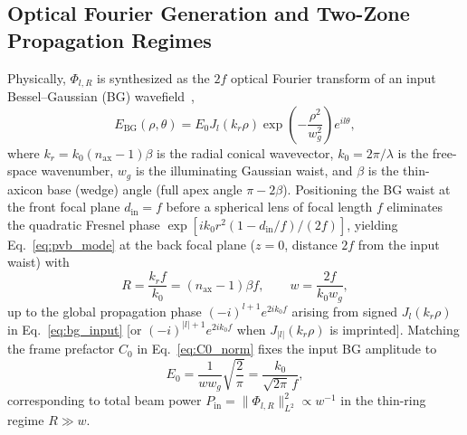 \documentclass[aps,pra,reprint,nofootinbib,floatfix,longbibliography]{revtex4-2}
\theoremstyle{remark}
\newcommand{\norm}[1]{\lVert #1 \rVert}
\newcommand{\abs}[1]{\lvert #1 \rvert}
\begin{document}
\subsection{Optical Fourier Generation and Two-Zone Propagation Regimes}
\label{subsec:generation_bridge}

Physically, $\Phi_{l,R}$ is synthesized as the $2f$ optical Fourier transform of an input Bessel--Gaussian (BG) wavefield~\cite{Vaity2015,Gori1987},
\begin{equation}
E_{\mathrm{BG}}(\rho,\theta) = E_0 J_l(k_r\rho)\exp\!\left(-\frac{\rho^2}{w_g^2}\right) e^{il\theta},
\label{eq:bg_input}
\end{equation}
where $k_r = k_0 (n_{\mathrm{ax}} - 1)\beta$ is the radial conical wavevector, $k_0 = 2\pi/\lambda$ is the free-space wavenumber, $w_g$ is the illuminating Gaussian waist, and $\beta$ is the thin-axicon base (wedge) angle (full apex angle $\pi - 2\beta$). Positioning the BG waist at the front focal plane $d_{\mathrm{in}} = f$ before a spherical lens of focal length $f$ eliminates the quadratic Fresnel phase $\exp[ik_0 r^2(1 - d_{\mathrm{in}}/f)/(2f)]$, yielding Eq.~\eqref{eq:pvb_mode} at the back focal plane ($z = 0$, distance $2f$ from the input waist) with~\cite{Vaity2015}
\begin{equation}
R = \frac{k_r f}{k_0} = (n_{\mathrm{ax}} - 1)\beta f, \qquad w = \frac{2f}{k_0 w_g},
\label{eq:R_w_2f}
\end{equation}
up to the global propagation phase $(-i)^{l+1} e^{2ik_0 f}$ arising from signed $J_l(k_r\rho)$ in Eq.~\eqref{eq:bg_input} [or $(-i)^{\abs{l}+1} e^{2ik_0 f}$ when $J_{\abs{l}}(k_r\rho)$ is imprinted]. Matching the frame prefactor $C_0$ in Eq.~\eqref{eq:C0_norm} fixes the input BG amplitude to
\begin{equation}
E_0 = \frac{1}{w w_g}\sqrt{\frac{2}{\pi}} = \frac{k_0}{\sqrt{2\pi}\,f},
\label{eq:E0_bridge}
\end{equation}
corresponding to total beam power $P_{\mathrm{in}} = \norm{\Phi_{l,R}}_{L^2}^2 \propto w^{-1}$ in the thin-ring regime $R \gg w$.
\end{document}
